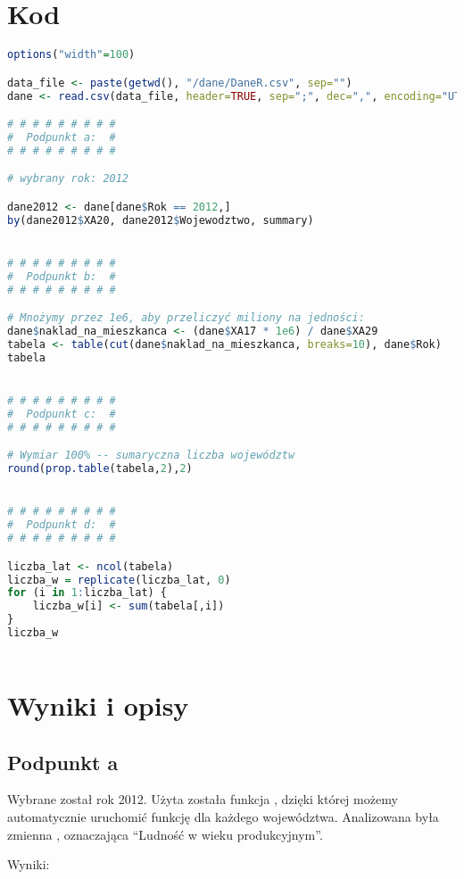 \newpage

\section*{Kod}

\begin{lstlisting}[language=R]
options("width"=100)

data_file <- paste(getwd(), "/dane/DaneR.csv", sep="")
dane <- read.csv(data_file, header=TRUE, sep=";", dec=",", encoding="UTF-8")

# # # # # # # # #
#  Podpunkt a:  #
# # # # # # # # #

# wybrany rok: 2012

dane2012 <- dane[dane$Rok == 2012,]
by(dane2012$XA20, dane2012$Wojewodztwo, summary)


# # # # # # # # #
#  Podpunkt b:  #
# # # # # # # # #

# Mnożymy przez 1e6, aby przeliczyć miliony na jedności:
dane$naklad_na_mieszkanca <- (dane$XA17 * 1e6) / dane$XA29
tabela <- table(cut(dane$naklad_na_mieszkanca, breaks=10), dane$Rok)
tabela


# # # # # # # # #
#  Podpunkt c:  #
# # # # # # # # #

# Wymiar 100% -- sumaryczna liczba województw
round(prop.table(tabela,2),2) 


# # # # # # # # #
#  Podpunkt d:  #
# # # # # # # # #

liczba_lat <- ncol(tabela)
liczba_w = replicate(liczba_lat, 0)
for (i in 1:liczba_lat) {
    liczba_w[i] <- sum(tabela[,i])
}
liczba_w
    
\end{lstlisting}

\section*{Wyniki i opisy}

\subsection{Podpunkt a}

Wybrane został rok 2012. Użyta została funkcja , dzięki której możemy
automatycznie uruchomić funkcję  dla każdego województwa.
Analizowana była zmienna , oznaczająca ``Ludność w wieku produkcyjnym''.

Wyniki:

